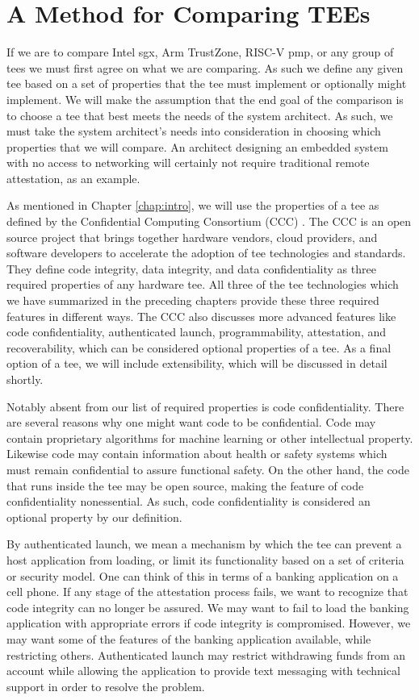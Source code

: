 \section{A Method for Comparing TEEs}
If we are to compare Intel \gls{sgx}, Arm TrustZone, RISC-V \gls{pmp}, or any group of \glspl{tee} we must first agree on what we are comparing. As such we define any given \gls{tee} based on a set of properties that the \gls{tee} must implement or optionally might implement. We will make the assumption that the end goal of the comparison is to choose a \gls{tee} that best meets the needs of the system architect. As such, we must take the system architect's needs into consideration in choosing which properties that we will compare. An architect designing an embedded system with no access to networking will certainly not require traditional remote \gls{attestation}, as an example. 

As mentioned in Chapter \ref{chap:intro}, we will use the properties of a \gls{tee} as defined by the Confidential Computing Consortium (CCC) \cite{cccTAC}. The CCC is an open source project that brings together hardware vendors, cloud providers, and software developers to accelerate the adoption of \gls{tee} technologies and standards. They define code integrity, data integrity, and data confidentiality as three required properties of any hardware \gls{tee}. All three of the \gls{tee} technologies which we have summarized in the preceding chapters provide these three required features in different ways. The CCC also discusses more advanced features like code confidentiality, authenticated launch, programmability, \gls{attestation}, and recoverability, which can be considered optional properties of a \gls{tee}. As a final option of a \gls{tee}, we will include extensibility, which will be discussed in detail shortly.

Notably absent from our list of required properties is code confidentiality. There are several reasons why one might want code to be confidential. Code may contain proprietary algorithms for machine learning or other intellectual property. Likewise code may contain information about health or safety systems which must remain confidential to assure functional safety. On the other hand, the code that runs inside the \gls{tee} may be open source, making the feature of code confidentiality nonessential. As such, code confidentiality is considered an optional property by our definition.

By authenticated launch, we mean a mechanism by which the \gls{tee} can prevent a host application from loading, or limit its functionality based on a set of criteria or security model. One can think of this in terms of a banking application on a cell phone. If any stage of the \gls{attestation} process fails, we want to recognize that code integrity can no longer be assured. We may want to fail to load the banking application with appropriate errors if code integrity is compromised. However, we may want some of the features of the banking application available, while restricting others. Authenticated launch may restrict withdrawing funds from an account while allowing the application to provide text messaging with technical support in order to resolve the problem.

